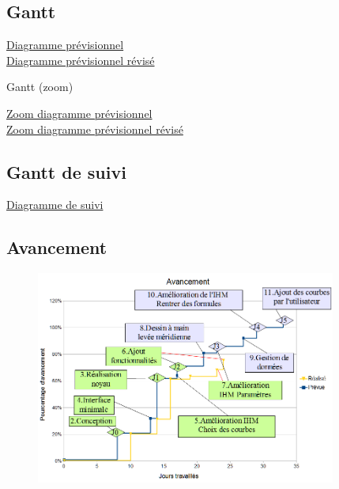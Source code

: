 \documentclass[xcolor=dvipsnames]{beamer}
\begin{document}
	\subsection{Gantt}
	\begin{frame}{\subsecname}
		\begin{center}
			\href{run:./Images/Gantt_ProjetDiscret.gif}{Diagramme pr\'evisionnel}\\
			\bigskip
			\href{run:Images/Gantt_ProjetDiscretReference.gif}{Diagramme pr\'evisionnel r\'evis\'e}
		\end{center}
	\end{frame}

	
	\begin{frame}{Gantt (zoom)}
		\begin{center}
			\href{run:Images/GantInitialClasses.gif}{Zoom diagramme pr\'evisionnel}\\
			\bigskip
			\href{run:Images/GantReferenceClasses.gif}{Zoom diagramme prévisionnel révisé}
		\end{center}
	\end{frame}

	
	\subsection{Gantt de suivi}
	\begin{frame}{\subsecname}
		\begin{center}
			\href{run:Images/Gantt_ProjetDiscretSuivi2.gif}{Diagramme de suivi}
		\end{center}
	\end{frame}


	\subsection{Avancement}
	\begin{frame}{\subsecname}
		\begin{figure}
			\includegraphics[height=7cm]{Images/Avancement.png}
		\end{figure}
	\end{frame}
\end{document}

